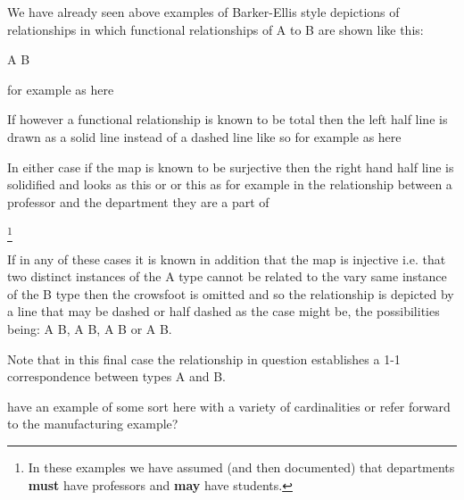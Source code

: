 \mynote We have already seen above examples of Barker-Ellis style depictions of relationships in which functional relationships of A to B
are shown like this:
\begin{center}
A\,\barkerEllisA\,B
\end{center}
\noindent for example as here
\begin{center}

\end{center}
If however a functional relationship is known to be total then the left half line is drawn as a solid line instead of a dashed line like so \barkerEllisC
for example as here 
\begin{center}

\end{center}
In either case if the map is known to be surjective then the right hand half line is solidified and looks as this \barkerEllisB or \barkerEllisD
or this
as for example in the relationship between a professor and the department they are a part of 
\begin{center}

\end{center}
\footnote{In these examples we have assumed (and then documented) that departments \textbf{must} have professors and \textbf{may} have students.}

If in any of these cases it is known in addition  that the map is injective i.e. that two distinct instances of the A type cannot be related to the vary same instance of the B type then the crowsfoot is omitted and so the relationship is depicted by a line that
may be dashed or half dashed as the case might be, the possibilities being:
A\,\barkerEllisE\,B, 
A\,\barkerEllisF\,B, 
A\,\barkerEllisG\,B or 
A\,\barkerEllisH\,B.

Note that in this final case the relationship in question establishes a 1-1 correspondence between types A and B.

\begin{noteforfuture}
have an example of some sort here with a variety of cardinalities or refer forward to the manufacturing example?
\end{noteforfuture}

